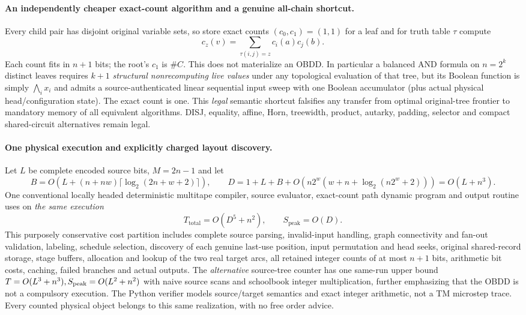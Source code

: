 \documentclass[11pt]{article}
\begin{document}
\paragraph{An independently cheaper exact-count algorithm and a genuine all-chain shortcut.}
Every child pair has disjoint original variable sets, so store exact counts $(c_0,c_1)=(1,1)$ for a leaf and for truth table $\tau$ compute
\[
c_z(v)=\sum_{\tau(i,j)=z}c_i(a)c_j(b).
\]
Each count fits in $n+1$ bits; the root's $c_1$ is $\#C$. This does not materialize an OBDD. In particular a balanced AND formula on $n=2^k$ distinct leaves requires $k+1$ \emph{structural nonrecomputing live values} under any topological evaluation of that tree, but its Boolean function is simply $\bigwedge_ix_i$ and admits a source-authenticated linear sequential input sweep with one Boolean accumulator (plus actual physical head/configuration state). The exact count is one. This \emph{legal} semantic shortcut falsifies any transfer from optimal original-tree frontier to mandatory memory of all equivalent algorithms. DISJ, equality, affine, Horn, treewidth, product, autarky, padding, selector and compact shared-circuit alternatives remain legal.

\paragraph{One physical execution and explicitly charged layout discovery.}
Let $L$ be complete encoded source bits, $M=2n-1$ and let
\[
B=O(L+(n+nw)\lceil\log_2(2n+w+2)\rceil),\qquad
D=1+L+B+O(n2^w(w+n+\log_2(n2^w+2)))=O(L+n^3).
\]
One conventional locally headed deterministic multitape compiler, source evaluator, exact-count path dynamic program and output routine uses on \emph{the same execution}
\[
T_{\mathrm{total}}=O(D^5+n^2),\qquad S_{\mathrm{peak}}=O(D).
\]
This purposely conservative cost partition includes complete source parsing, invalid-input handling, graph connectivity and fan-out validation, labeling, schedule selection, discovery of each genuine last-use position, input permutation and head seeks, original shared-record storage, stage buffers, allocation and lookup of the two real target arcs, all retained integer counts of at most $n+1$ bits, arithmetic bit costs, caching, failed branches and actual outputs. The \emph{alternative} source-tree counter has one same-run upper bound $T=O(L^3+n^3),S_{\rm peak}=O(L^2+n^2)$ with naive source scans and schoolbook integer multiplication, further emphasizing that the OBDD is not a compulsory execution. The Python verifier models source/target semantics and exact integer arithmetic, not a TM microstep trace. Every counted physical object belongs to this same realization, with no free order advice.
\end{document}
